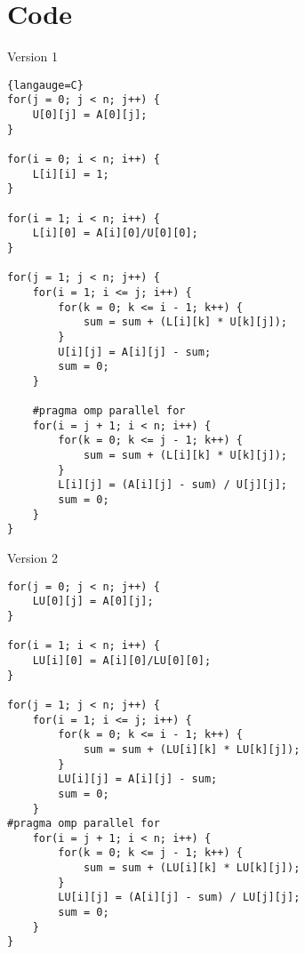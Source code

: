 \section{Code}
\begin{center}
    Version 1
\end{center}

\begin{lstlisting}{langauge=C}
for(j = 0; j < n; j++) {
    U[0][j] = A[0][j];
}

for(i = 0; i < n; i++) {
    L[i][i] = 1;
}

for(i = 1; i < n; i++) {
    L[i][0] = A[i][0]/U[0][0];
}

for(j = 1; j < n; j++) {
    for(i = 1; i <= j; i++) {
        for(k = 0; k <= i - 1; k++) {
            sum = sum + (L[i][k] * U[k][j]);
        }
        U[i][j] = A[i][j] - sum;
        sum = 0;
    }

    #pragma omp parallel for
    for(i = j + 1; i < n; i++) {
        for(k = 0; k <= j - 1; k++) {
            sum = sum + (L[i][k] * U[k][j]);
        }
        L[i][j] = (A[i][j] - sum) / U[j][j];
        sum = 0;
    }
}
\end{lstlisting}
\begin{center}
    Version 2
\end{center}
\begin{lstlisting}
for(j = 0; j < n; j++) {
    LU[0][j] = A[0][j];
}

for(i = 1; i < n; i++) {
    LU[i][0] = A[i][0]/LU[0][0];
}

for(j = 1; j < n; j++) {
    for(i = 1; i <= j; i++) {
        for(k = 0; k <= i - 1; k++) {
            sum = sum + (LU[i][k] * LU[k][j]);
        }
        LU[i][j] = A[i][j] - sum;
        sum = 0;
    }
#pragma omp parallel for
    for(i = j + 1; i < n; i++) {
        for(k = 0; k <= j - 1; k++) {
            sum = sum + (LU[i][k] * LU[k][j]);
        }
        LU[i][j] = (A[i][j] - sum) / LU[j][j];
        sum = 0;
    }
}
\end{lstlisting}
